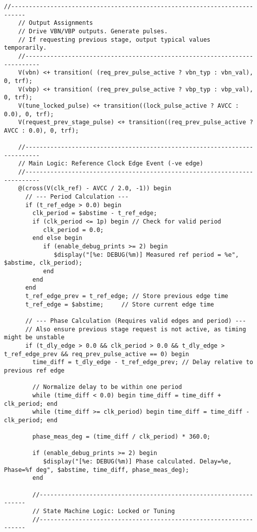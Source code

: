 \begin{lstlisting}[caption={Verilog-A Generic Vb Tuner Implementation}]
    //--------------------------------------------------------------------------
    // Output Assignments
    // Drive VBN/VBP outputs. Generate pulses.
    // If requesting previous stage, output typical values temporarily.
    //--------------------------------------------------------------------------
    V(vbn) <+ transition( (req_prev_pulse_active ? vbn_typ : vbn_val), 0, trf);
    V(vbp) <+ transition( (req_prev_pulse_active ? vbp_typ : vbp_val), 0, trf);
    V(tune_locked_pulse) <+ transition((lock_pulse_active ? AVCC : 0.0), 0, trf);
    V(request_prev_stage_pulse) <+ transition((req_prev_pulse_active ? AVCC : 0.0), 0, trf);

    //--------------------------------------------------------------------------
    // Main Logic: Reference Clock Edge Event (-ve edge)
    //--------------------------------------------------------------------------
    @(cross(V(clk_ref) - AVCC / 2.0, -1)) begin
      // --- Period Calculation ---
      if (t_ref_edge > 0.0) begin
        clk_period = $abstime - t_ref_edge;
        if (clk_period <= 1p) begin // Check for valid period
           clk_period = 0.0;
        end else begin
           if (enable_debug_prints >= 2) begin
              $display("[%e: DEBUG(%m)] Measured ref period = %e", $abstime, clk_period);
           end
        end
      end
      t_ref_edge_prev = t_ref_edge; // Store previous edge time
      t_ref_edge = $abstime;     // Store current edge time

      // --- Phase Calculation (Requires valid edges and period) ---
      // Also ensure previous stage request is not active, as timing might be unstable
      if (t_dly_edge > 0.0 && clk_period > 0.0 && t_dly_edge > t_ref_edge_prev && req_prev_pulse_active == 0) begin
        time_diff = t_dly_edge - t_ref_edge_prev; // Delay relative to previous ref edge

        // Normalize delay to be within one period
        while (time_diff < 0.0) begin time_diff = time_diff + clk_period; end
        while (time_diff >= clk_period) begin time_diff = time_diff - clk_period; end

        phase_meas_deg = (time_diff / clk_period) * 360.0;

        if (enable_debug_prints >= 2) begin
           $display("[%e: DEBUG(%m)] Phase calculated. Delay=%e, Phase=%f deg", $abstime, time_diff, phase_meas_deg);
        end

        //------------------------------------------------------------------
        // State Machine Logic: Locked or Tuning
        //------------------------------------------------------------------


\end{lstlisting}
